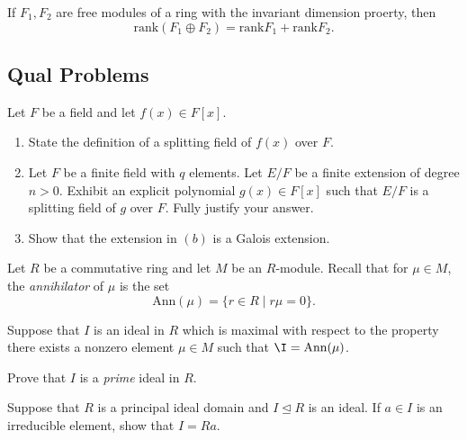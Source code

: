 \begin{problem}[Hungerford 4.2.9]
\label{prob:1.1}
If $F_1, F_2$ are free modules of a ring with the invariant dimension proerty, then 
\[
\mathrm{rank}(F_1 \oplus F_2) = \mathrm{rank} F_1 + \mathrm{rank} F_2.
\]
\end{problem}

\newpage
\subsection{Qual Problems}

\begin{problem}
\label{prob:1.1}
Let $F$ be a field and let $f(x) \in F[x]$.
\begin{enumerate}
    \item State the definition of a splitting field of $f(x)$ over $F$.
    
    \item Let $F$ be a finite field with $q$ elements. Let $E/F$ be a finite extension of degree $n>0$. Exhibit an explicit polynomial $g(x) \in F[x]$ such that $E/F$ is a splitting field of $g$ over $F$. Fully justify your answer.
    
    \item Show that the extension in $(b)$ is a Galois extension.
\end{enumerate}
\end{problem}

\begin{problem}
\label{prob:1.1}
Let $R$ be a commutative ring and let $M$ be an $R$-module. Recall that for $\mu \in M$, the \textit{annihilator} of $\mu$ is the set 
\[
\mathrm{Ann}(\mu) = \{ r\in R \mid r\mu = 0\}.
\]

Suppose that $I$ is an ideal in $R$ which is maximal with respect to the property there exists a nonzero element $\mu \in M$ such that $\I = \mathrm{Ann}(\mu)$.

Prove that $I$ is a \textit{prime} ideal in $R$.

\end{problem}

\begin{problem}
\label{prob:1.1}
Suppose that $R$ is a principal ideal domain and $I \trianglelefteq R$ is an ideal. If $a\in I$ is an irreducible element, show that $I = Ra$.
\end{problem}